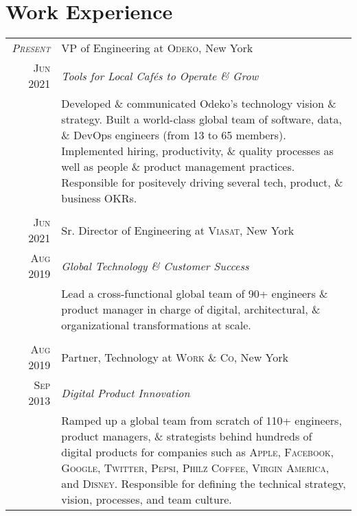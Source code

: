 \documentclass[a4paper,10pt]{article}
\begin{document}
\section{Work Experience}
\begin{tabular}{r|p{14cm}}
  \textsc{\emph{Present}} & VP of Engineering at \textsc{Odeko}, New York \\

  \textsc{Jun 2021} & \emph{Tools for Local Caf\'{e}s to Operate \& Grow}\\

  &\footnotesize{Developed \& communicated Odeko's technology
    vision \& strategy. Built a world-class global team of software, data, \&
    DevOps engineers (from 13 to 65 members). Implemented hiring,
    productivity, \& quality processes as well as people \& product
    management practices. Responsible for positevely driving several
    tech, product, \& business OKRs.}\\

  \multicolumn{2}{c}{}\\

  \textsc{Jun 2021} & Sr. Director of Engineering at \textsc{Viasat}, New York \\

  \textsc{Aug 2019} & \emph{Global Technology \& Customer Success}\\

  &\footnotesize{Lead a cross-functional global team of 90+
    engineers \& product manager in charge of digital, architectural,
    \& organizational transformations at scale.}\\

  \multicolumn{2}{c}{}\\

  \textsc{Aug 2019} & Partner, Technology at \textsc{Work \& Co}, New York \\

  \textsc{Sep 2013} & \emph{Digital Product Innovation}\\

  &\footnotesize{Ramped up a global team from scratch of 110+
    engineers, product managers, \& strategists behind hundreds of
    digital products for companies such as \textsc{Apple},
    \textsc{Facebook}, \textsc{Google}, \textsc{Twitter},
    \textsc{Pepsi}, \textsc{Philz Coffee}, \textsc{Virgin America},
    and \textsc{Disney}. Responsible for defining the technical
    strategy, vision, processes, and team culture.}\\


\end{tabular}
\end{document}
